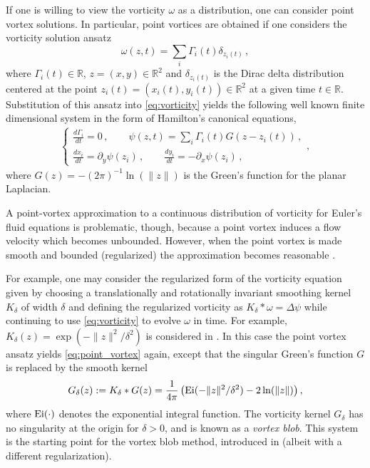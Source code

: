 \documentclass[12pt]{amsart}
\theoremstyle{remark}
\begin{document}
If one is willing to view the vorticity $\omega$ as a distribution, one can consider point vortex solutions.
In particular, point vortices are obtained if one considers the vorticity solution ansatz 
\[\omega(z,t) = \sum_{i} \Gamma_i(t) \delta_{z_i(t)}\,,\]
where $\Gamma_i(t) \in \mathbb{R}$, $z=(x,y) \in \mathbb{R}^2$ and $\delta_{z_i(t)}$ is the Dirac delta distribution centered at the point $z_i(t) = (x_i(t),y_i(t)) \in \mathbb{R}^2$
at a given time $t \in \mathbb{R}$.
Substitution of this ansatz into \eqref{eq:vorticity} yields the following well known finite dimensional system in the form  of Hamilton's canonical equations,
\begin{align}
\begin{cases}
	\frac{d \Gamma_i}{dt} = 0 \,,\quad  \quad \psi(z,t) = \sum_i  \Gamma_i(t) G(z-z_i(t)) \,, \\
	\frac{dx_i}{dt} = \partial_y \psi(z_i) \,,\quad  \quad \frac{dy_i}{dt} = - \partial_x \psi(z_i)\,,
\end{cases} \label{eq:point_vortex},
\end{align}
where $G(z) =  - (2\pi)^{-1} \ln( \| z \|)$ is the Green's function for the planar Laplacian. 

A point-vortex approximation to a continuous distribution of vorticity for Euler's fluid equations is problematic, though, because a point vortex induces a flow velocity which becomes unbounded. However, when the point vortex is made smooth and bounded (regularized) the approximation becomes reasonable  \cite{Chorin1973}.

For example, one may consider the regularized form of the vorticity equation given by
choosing a translationally and rotationally invariant smoothing kernel $K_\delta$ of width $\delta$ and defining the regularized vorticity as 
$K_\delta* \omega = \Delta \psi$ while continuing to use \eqref{eq:vorticity} to evolve $\omega$ in time.
For example, $K_\delta (z) = \exp( - \| z\|^2 / \delta^2)$ is considered in \cite{BealeMajda1985}.
In this case the point vortex ansatz yields \eqref{eq:point_vortex} again, except that the singular Green's function $G$ is replaced by the smooth kernel
\begin{align}
	G_\delta(z) := K_\delta*G(z) = \frac{1}{4\pi} \left( {\rm Ei}(- \| z \|^2 / \delta^2) - 2\ln ( \| z \|) \right), \label{eq:kernel}
\end{align}
where ${\rm Ei}( \cdot )$ denotes the exponential integral function.
The vorticity kernel $G_\delta$ has no singularity at the origin for $\delta > 0$, and is known as a \textit{vortex blob}.
This system is the starting point for the vortex blob method, introduced in \cite{Chorin1973} (albeit with a different regularization).
\end{document}
